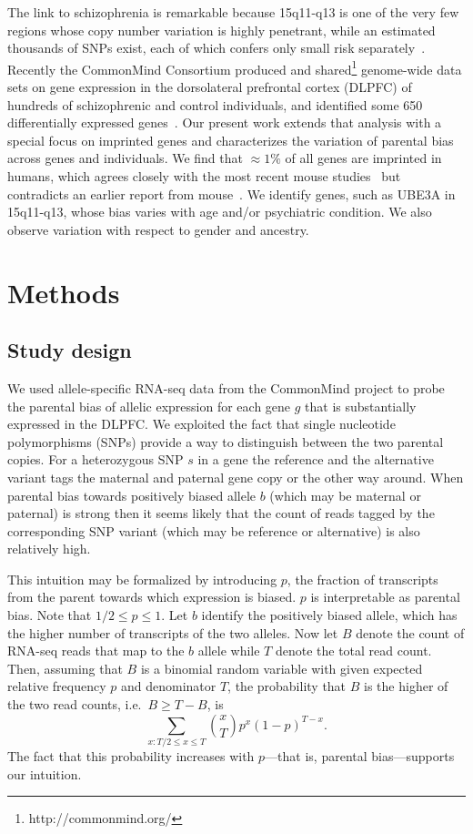 \documentclass[letterpaper]{article}
\begin{document}
The link to schizophrenia is remarkable because 15q11-q13 is one of the very
few regions whose copy number variation is highly penetrant, while an
estimated thousands of SNPs exist, each of which confers only small risk
separately~\cite{Sullivan2012}.  Recently the CommonMind Consortium produced
and shared\footnote{http://commonmind.org/} genome-wide data sets on gene
expression in the dorsolateral prefrontal cortex (DLPFC) of hundreds of
schizophrenic and control individuals, and identified some 650 differentially
expressed genes~\cite{Fromer2016a}.  Our present work extends that analysis
with a special focus on imprinted genes and characterizes the variation of
parental bias across genes and individuals.  We find that \(\approx
1\%\) of all genes are imprinted in humans, which agrees closely with the most
recent mouse studies~\cite{Perez2015,DeVeale2012} but contradicts an earlier
report from mouse~\cite{Gregg2010a}.  We identify genes, such as UBE3A in 15q11-q13,
whose bias varies with age and/or psychiatric condition.  We also observe
variation with respect to gender and ancestry.

\section{Methods}

\subsection{Study design}

We used allele-specific RNA-seq data from the CommonMind project to probe the parental bias of allelic
expression for each gene \(g\) that is substantially expressed in the DLPFC.
We exploited the fact that single nucleotide polymorphisms (SNPs) provide a
way to distinguish between the two parental copies.  For a heterozygous SNP
\(s\) in a gene the reference and the alternative variant tags the maternal
and paternal gene copy or the other way around.  When parental bias towards
positively biased allele \(b\) (which may be maternal or paternal) is strong
then it seems likely that the count of reads tagged by the corresponding SNP
variant (which may be reference or alternative) is also relatively high.

This intuition may be formalized by introducing \(p\), the fraction of
transcripts from the parent towards which expression is biased.  \(p\) is
interpretable as parental bias.  Note that \(1/2\le p\le 1\).  Let \(b\)
identify the positively biased allele, which has the higher number of
transcripts of the two alleles.  Now let \(B\) denote the count of RNA-seq
reads that map to the \(b\) allele while \(T\) denote the total read count.
Then, assuming that \(B\) is a binomial random variable with given expected
relative frequency \(p\) and denominator \(T\), the probability that \(B\) is
the higher of the two read counts, i.e.~\(B \ge T - B\), is \[\sum_{x:T/2\le
x\le T} {x \choose T} p^x (1 - p)^{T-x}.\] The fact that this probability
increases with \(p\)---that is, parental bias---supports our intuition.
\end{document}
